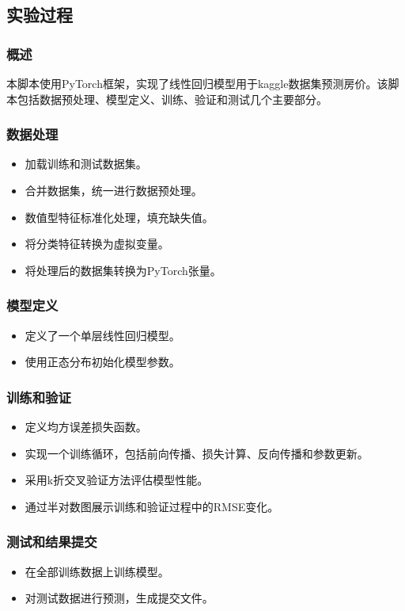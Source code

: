 \documentclass[a4paper,12pt]{article}
\begin{document}
\subsection{实验过程}
\subsubsection{概述}
本脚本使用PyTorch框架，实现了线性回归模型用于kaggle数据集预测房价。该脚本包括数据预处理、模型定义、训练、验证和测试几个主要部分。

\subsubsection{数据处理}
\begin{itemize}
	\item 加载训练和测试数据集。
	\item 合并数据集，统一进行数据预处理。
	\item 数值型特征标准化处理，填充缺失值。
	\item 将分类特征转换为虚拟变量。
	\item 将处理后的数据集转换为PyTorch张量。
\end{itemize}

\subsubsection{模型定义}
\begin{itemize}
	\item 定义了一个单层线性回归模型。
	\item 使用正态分布初始化模型参数。
\end{itemize}

\subsubsection{训练和验证}
\begin{itemize}
	\item 定义均方误差损失函数。
	\item 实现一个训练循环，包括前向传播、损失计算、反向传播和参数更新。
	\item 采用k折交叉验证方法评估模型性能。
	\item 通过半对数图展示训练和验证过程中的RMSE变化。
\end{itemize}

\subsubsection{测试和结果提交}
\begin{itemize}
	\item 在全部训练数据上训练模型。
	\item 对测试数据进行预测，生成提交文件。
\end{itemize}
\end{document}
